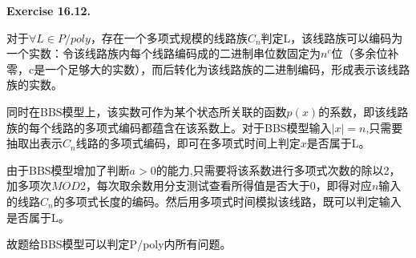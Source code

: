 \documentclass[a4paper]{article}
\newenvironment{exercise}[1]{
	\par
	\noindent\textbf{Exercise #1.}\quad
}{
	\par
	\bigskip
}
\begin{document}
	\begin{exercise}{16.12}
		对于$\forall L\in P/poly$，存在一个多项式规模的线路族${C_n}$判定L，该线路族可以编码为一个实数：令该线路族内每个线路编码成的二进制串位数固定为$n^c$位（多余位补零，c是一个足够大的实数），而后转化为该线路族的二进制编码，形成表示该线路族的实数。
		
		同时在BBS模型上，该实数可作为某个状态所关联的函数$p(x)$的系数，即该线路族的每个线路的多项式编码都蕴含在该系数上。对于BBS模型输入$|x|=n$,只需要抽取出表示$C_n$线路的多项式编码，即可在多项式时间上判定$x$是否属于L。
		
		由于BBS模型增加了判断$a>0$的能力,只需要将该系数进行多项式次数的除以2，加多项次$MOD 2$，每次取余数用分支测试查看所得值是否大于0，即得对应$n$输入的线路$C_n$的多项式长度的编码。然后用多项式时间模拟该线路，既可以判定输入是否属于L。
		
		故题给BBS模型可以判定P/poly内所有问题。		
	\end{exercise}
\end{document}
